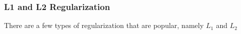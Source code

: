 \subsubsection{L1 and L2 Regularization}

There are a few types of regularization that are popular, namely $L_1$ and $L_2$